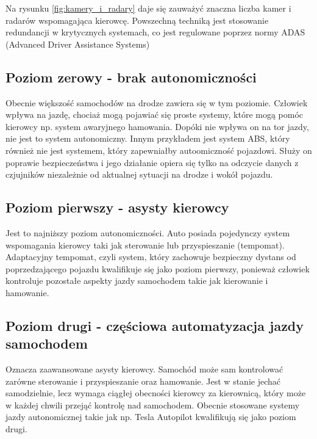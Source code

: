 Na rysunku \ref{fig:kamery_i_radary} daje się zauważyć znaczna liczba kamer i radarów wspomagająca kierowcę. Powszechną techniką jest stosowanie redundancji w krytycznych systemach, co jest regulowane poprzez normy ADAS (Advanced Driver Assistance Systems)

\subsection{Poziom zerowy - brak autonomiczności}
Obecnie większość samochodów na drodze zawiera się w tym poziomie. Człowiek wpływa na jazdę, chociaż mogą pojawiać się proste systemy, które mogą pomóc kierowcy np. system awaryjnego hamowania. Dopóki nie wpływa on na tor jazdy, nie jest to system autonomiczny. Innym przykładem jest system ABS, który również nie jest systemem, który zapewniałby autoomiczność pojazdowi. Służy on poprawie bezpieczeństwa i jego działanie opiera się tylko na odczycie danych z czjujników niezależnie od aktualnej sytuacji na drodze i wokół pojazdu.

\subsection{Poziom pierwszy - asysty kierowcy}
Jest to najniższy poziom autonomiczności. Auto posiada pojedynczy system wspomagania kierowcy taki jak sterowanie lub przyspieszanie (tempomat). Adaptacyjny tempomat, czyli system, który zachowuje bezpieczny dystans od poprzedzającego pojazdu kwalifikuje się jako poziom pierwszy, ponieważ człowiek kontroluje pozostałe aspekty jazdy samochodem takie jak kierowanie i hamowanie.

\subsection{Poziom drugi - częściowa automatyzacja jazdy samochodem}
Oznacza zaawansowane asysty kierowcy. Samochód może sam kontrolować zarówne sterowanie i przyspieszanie oraz hamowanie. Jest w stanie jechać samodzielnie, lecz wymaga ciągłej obecności kierowcy za kierownicą, który może w każdej chwili przejąć kontrolę nad samochodem. Obecnie stosowane systemy jazdy autonomicznej takie jak np. Tesla Autopilot kwalifikują się jako poziom drugi.

